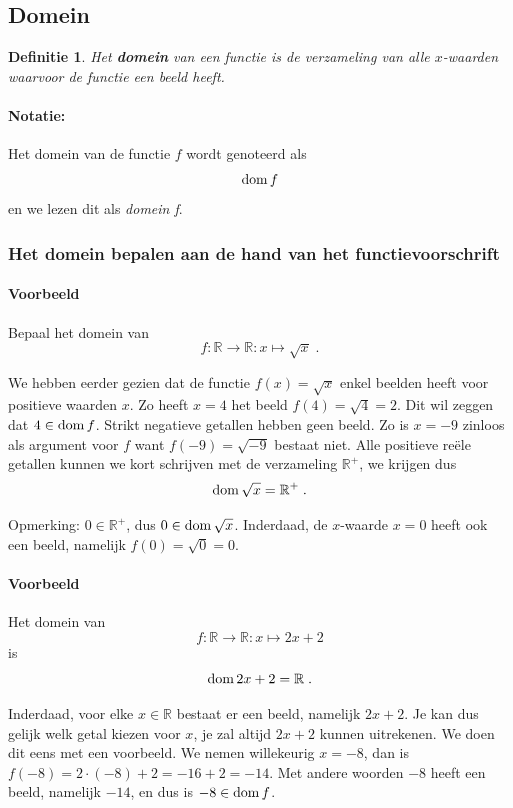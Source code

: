 \documentclass[12pt,twoside]{article}
\newtheorem{definition}{Definitie}
\begin{document}
\begin{theorie}
\subsection{Domein}

\begin{definition}
  Het {\bf domein} van een functie is de verzameling van alle $x$-waarden waarvoor de functie een beeld heeft.
\end{definition}

\paragraph{Notatie:} Het domein van de functie $f$ wordt genoteerd als $$\dom f$$ en we lezen dit als {\em domein f}.

\subsubsection{Het domein bepalen aan de hand van het functievoorschrift}

\paragraph{Voorbeeld} Bepaal het domein van $$f:\mathbb{R}\to\mathbb{R}:x\mapsto \sqrt{x}\;.$$

We hebben eerder gezien dat de functie $f(x)=\sqrt{x}$ enkel beelden heeft voor positieve waarden $x$. Zo heeft $x=4$ het beeld $f(4)=\sqrt{4}=2$. Dit wil zeggen dat $4\in\dom f$. Strikt negatieve getallen hebben geen beeld. Zo is $x=-9$ zinloos als argument voor $f$ want $f(-9)=\sqrt{-9}$ bestaat niet. Alle positieve reële getallen kunnen we kort schrijven met de verzameling $\mathbb{R}^+$, we krijgen dus
$$\dom \sqrt{x}= \mathbb{R}^+\;.$$

Opmerking: $0\in\mathbb{R}^+$, dus $0\in\dom\sqrt{x}$. Inderdaad, de $x$-waarde $x=0$ heeft ook een beeld, namelijk $f(0)=\sqrt{0}=0$.

\paragraph{Voorbeeld}
Het domein van
$$f:\mathbb{R}\to\mathbb{R}:x\mapsto 2x+2$$
is
$$\dom 2x+2 = \mathbb{R}\;.$$

Inderdaad, voor elke $x\in\mathbb{R}$ bestaat er een beeld, namelijk $2x+2$. Je kan dus gelijk welk getal kiezen voor $x$, je zal altijd $2x+2$ kunnen uitrekenen. We doen dit eens met een voorbeeld. We nemen willekeurig $x=-8$, dan is $f(-8)=2\cdot(-8)+2=-16+2=-14$. Met andere woorden $-8$ heeft een beeld, namelijk $-14$, en dus is $-8\in\dom f$.


\end{theorie}
\end{document}
